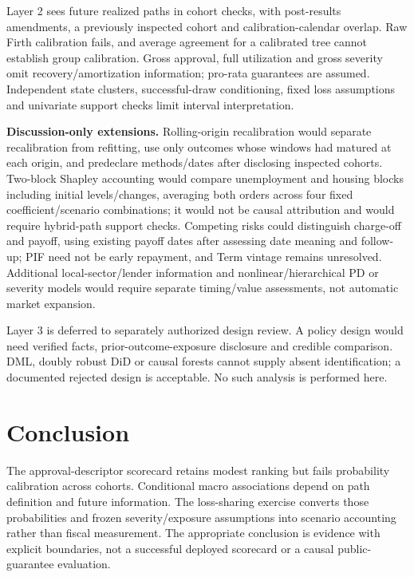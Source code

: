 Layer 2 sees future realized paths in cohort checks, with post-results amendments, a previously inspected cohort and calibration-calendar overlap. Raw Firth calibration fails, and average agreement for a calibrated tree cannot establish group calibration. Gross approval, full utilization and gross severity omit recovery/amortization information; pro-rata guarantees are assumed. Independent state clusters, successful-draw conditioning, fixed loss assumptions and univariate support checks limit interval interpretation.

\textbf{Discussion-only extensions.} Rolling-origin recalibration would separate recalibration from refitting, use only outcomes whose windows had matured at each origin, and predeclare methods/dates after disclosing inspected cohorts. Two-block Shapley accounting would compare unemployment and housing blocks including initial levels/changes, averaging both orders across four fixed coefficient/scenario combinations; it would not be causal attribution and would require hybrid-path support checks. Competing risks could distinguish charge-off and payoff, using existing payoff dates after assessing date meaning and follow-up; PIF need not be early repayment, and Term vintage remains unresolved. Additional local-sector/lender information and nonlinear/hierarchical PD or severity models would require separate timing/value assessments, not automatic market expansion.

Layer 3 is deferred to separately authorized design review. A policy design would need verified facts, prior-outcome-exposure disclosure and credible comparison. DML, doubly robust DiD or causal forests cannot supply absent identification; a documented rejected design is acceptable. No such analysis is performed here.

\section{Conclusion}
The approval-descriptor scorecard retains modest ranking but fails probability calibration across cohorts. Conditional macro associations depend on path definition and future information. The loss-sharing exercise converts those probabilities and frozen severity/exposure assumptions into scenario accounting rather than fiscal measurement. The appropriate conclusion is evidence with explicit boundaries, not a successful deployed scorecard or a causal public-guarantee evaluation.

